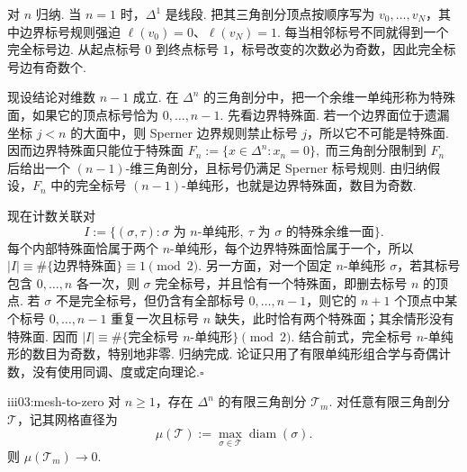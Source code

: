 \begin{FAProof}
对 \(\displaystyle n\) 归纳. 当 \(\displaystyle n=1\) 时，\(\displaystyle \Delta^1\) 是线段. 把其三角剖分顶点按顺序写为 \(\displaystyle v_0,\dots,v_N\)，其中边界标号规则强迫 \(\displaystyle \ell(v_0)=0\)、\(\displaystyle \ell(v_N)=1\). 每当相邻标号不同就得到一个完全标号边. 从起点标号 \(\displaystyle0\) 到终点标号 \(\displaystyle1\)，标号改变的次数必为奇数，因此完全标号边有奇数个.

现设结论对维数 \(\displaystyle n-1\) 成立. 在 \(\displaystyle \Delta^n\) 的三角剖分中，把一个余维一单纯形称为特殊面，如果它的顶点标号恰为 \(\displaystyle0,\dots,n-1\). 先看边界特殊面. 若一个边界面位于遗漏坐标 \(\displaystyle j<n\) 的大面中，则 Sperner 边界规则禁止标号 \(\displaystyle j\)，所以它不可能是特殊面. 因而边界特殊面只能位于特殊面
\(\displaystyle F_n:=\{x\in\Delta^n:x_n=0\},\)
而三角剖分限制到 \(\displaystyle F_n\) 后给出一个 \(\displaystyle (n-1)\)-维三角剖分，且标号仍满足 Sperner 标号规则. 由归纳假设，\(\displaystyle F_n\) 中的完全标号 \(\displaystyle (n-1)\)-单纯形，也就是边界特殊面，数目为奇数.

现在计数关联对
\[
I
:=
\{(\sigma,\tau):\sigma\text{ 为 }n\text{-单纯形},\ \tau\text{ 为 }\sigma\text{ 的特殊余维一面}\}.
\]
每个内部特殊面恰属于两个 \(\displaystyle n\)-单纯形，每个边界特殊面恰属于一个，所以
\(\displaystyle |I| \equiv \#\{\text{边界特殊面}\} \equiv 1 \pmod 2.\)
另一方面，对一个固定 \(\displaystyle n\)-单纯形 \(\displaystyle \sigma\)，若其标号包含 \(\displaystyle0,\dots,n\) 各一次，则 \(\displaystyle \sigma\) 完全标号，并且恰有一个特殊面，即删去标号 \(\displaystyle n\) 的顶点. 若 \(\displaystyle \sigma\) 不是完全标号，但仍含有全部标号 \(\displaystyle0,\dots,n-1\)，则它的 \(\displaystyle n+1\) 个顶点中某个标号 \(\displaystyle0,\dots,n-1\) 重复一次且标号 \(\displaystyle n\) 缺失，此时恰有两个特殊面；其余情形没有特殊面. 因而
\(\displaystyle |I| \equiv \#\{\text{完全标号 }n\text{-单纯形}\} \pmod 2.\)
结合前式，完全标号 \(\displaystyle n\)-单纯形的数目为奇数，特别地非零. 归纳完成. 论证只用了有限单纯形组合学与奇偶计数，没有使用同调、度或定向理论.\hfill\(\square\)

\end{FAProof}

\begin{FALemma}[C][网格直径趋零的三角剖分]{iii03:mesh-to-zero}
对 \(\displaystyle n\geqslant1\)，存在 \(\displaystyle \Delta^n\) 的有限三角剖分 \(\displaystyle \mathcal T_m\). 对任意有限三角剖分 \(\displaystyle\mathcal T\)，记其网格直径为
\[
\mu(\mathcal T)
:=
\max_{\sigma\in\mathcal T}\operatorname{diam}(\sigma).
\]
则 \(\displaystyle\mu(\mathcal T_m)\to0\).
\end{FALemma}

